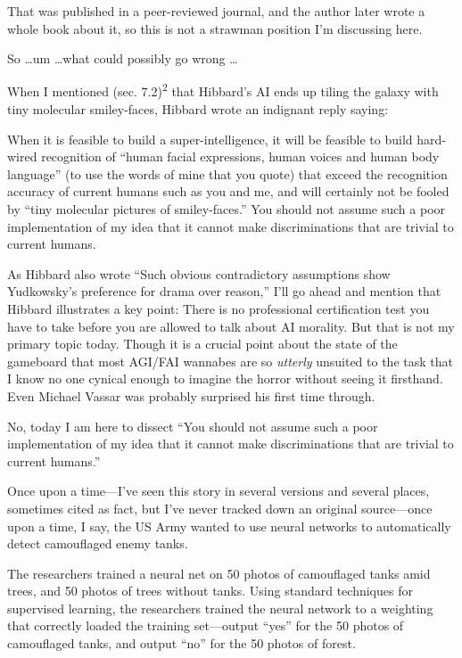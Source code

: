 {
 That was published in a peer-reviewed journal, and the author
later wrote a whole book about it, so this is not a strawman position
I'm discussing here.}

{
 So \ldots um \ldots what could possibly go wrong \ldots}

{
 When I mentioned (sec. 7.2)\textsuperscript{2} that
Hibbard's AI ends up tiling the galaxy with tiny
molecular smiley-faces, Hibbard wrote an indignant reply saying:}

{
 When it is feasible to build a super-intelligence, it will be
feasible to build hard-wired recognition of ``human
facial expressions, human voices and human body
language'' (to use the words of mine that you quote)
that exceed the recognition accuracy of current humans such as you and
me, and will certainly not be fooled by ``tiny
molecular pictures of smiley-faces.'' You should not
assume such a poor implementation of my idea that it cannot make
discriminations that are trivial to current humans.}

{
 As Hibbard also wrote ``Such obvious
contradictory assumptions show Yudkowsky's preference
for drama over reason,'' I'll go
ahead and mention that Hibbard illustrates a key point: There is no
professional certification test you have to take before you are allowed
to talk about AI morality. But that is not my primary topic today.
Though it is a crucial point about the state of the gameboard that most
AGI/FAI wannabes are so \textit{utterly} unsuited to the task that I
know no one cynical enough to imagine the horror without seeing it
firsthand. Even Michael Vassar was probably surprised his first time
through.}

{
 No, today I am here to dissect ``You should not
assume such a poor implementation of my idea that it cannot make
discriminations that are trivial to current
humans.''}

{
 Once upon a time---I've seen this story in several
versions and several places, sometimes cited as fact, but
I've never tracked down an original source---once upon
a time, I say, the US Army wanted to use neural networks to
automatically detect camouflaged enemy tanks.}

{
 The researchers trained a neural net on 50 photos of camouflaged
tanks amid trees, and 50 photos of trees without tanks. Using standard
techniques for supervised learning, the researchers trained the neural
network to a weighting that correctly loaded the training set---output
``yes'' for the 50 photos of
camouflaged tanks, and output ``no''
for the 50 photos of forest.}

